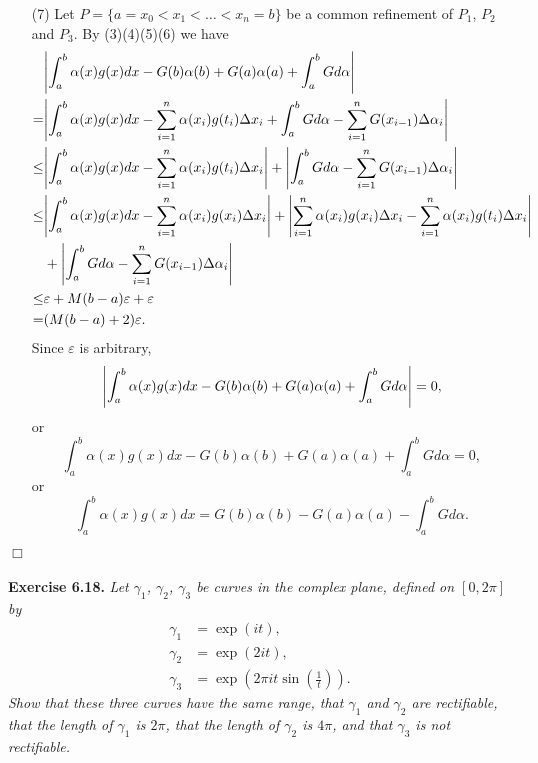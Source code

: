 \documentclass{article}
\begin{document}
\begin{enumerate}
  \item[(7)]
  Let $P = \{a = x_0 < x_1 < \ldots < x_n = b\}$
  be a common refinement of $P_1$, $P_2$ and $P_3$.
  By (3)(4)(5)(6) we have
  \begin{align*}
    &\abs{ \int_{a}^{b} \alpha(x)g(x)dx
      - G(b)\alpha(b) + G(a)\alpha(a) + \int_{a}^{b}G d\alpha } \\
    =& \abs{
      \int_{a}^{b} \alpha(x)g(x)dx - \sum_{i=1}^{n} \alpha(x_i)g(t_i)\Delta x_i
      +
      \int_{a}^{b}G d\alpha - \sum_{i=1}^{n} G(x_{i-1}) \Delta\alpha_i } \\
    \leq& \abs{
      \int_{a}^{b} \alpha(x)g(x)dx - \sum_{i=1}^{n} \alpha(x_i)g(t_i)\Delta x_i }
      +
      \abs{ \int_{a}^{b}G d\alpha - \sum_{i=1}^{n} G(x_{i-1}) \Delta\alpha_i } \\
    \leq& \abs{
      \int_{a}^{b} \alpha(x)g(x)dx - \sum_{i=1}^{n} \alpha(x_i)g(x_i)\Delta x_i }
      +
      \abs{ \sum_{i=1}^{n} \alpha(x_i)g(x_i)\Delta x_i
        - \sum_{i=1}^{n} \alpha(x_i)g(t_i)\Delta x_i } \\
      &+
      \abs{ \int_{a}^{b}G d\alpha - \sum_{i=1}^{n} G(x_{i-1}) \Delta\alpha_i } \\
    \leq& \varepsilon + M(b-a)\varepsilon + \varepsilon \\
    =& (M(b-a) + 2)\varepsilon.
  \end{align*}
  Since $\varepsilon$ is arbitrary,
  \[
    \abs{ \int_{a}^{b} \alpha(x)g(x)dx
      - G(b)\alpha(b) + G(a)\alpha(a) + \int_{a}^{b}G d\alpha }=0,
  \]
  or
  \[
    \int_{a}^{b} \alpha(x)g(x)dx
      - G(b)\alpha(b) + G(a)\alpha(a) + \int_{a}^{b}G d\alpha = 0,
  \]
  or
  \[
    \int_{a}^{b} \alpha(x)g(x)dx
    = G(b)\alpha(b) - G(a)\alpha(a) - \int_{a}^{b}G d\alpha.
  \]
\end{enumerate}
$\Box$ \\\\






\textbf{Exercise 6.18.}
\emph{Let $\gamma_1$, $\gamma_2$, $\gamma_3$ be curves in the complex plane,
defined on $[0,2\pi]$ by
\begin{align*}
  \gamma_1 &= \exp(it), \\
  \gamma_2 &= \exp(2it), \\
  \gamma_3 &= \exp(2\pi it \sin(\frac{1}{t})).
\end{align*}
Show that these three curves have the same range,
that $\gamma_1$ and $\gamma_2$ are rectifiable,
that the length of $\gamma_1$ is $2\pi$,
that the length of $\gamma_2$ is $4\pi$,
and that $\gamma_3$ is not rectifiable.} \\
\end{document}

